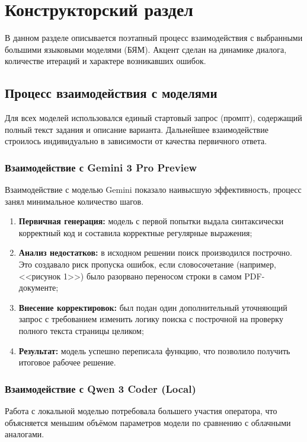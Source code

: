 \chapter{Конструкторский раздел}

В данном разделе описывается поэтапный процесс взаимодействия с выбранными большими языковыми моделями (БЯМ). Акцент сделан на динамике диалога, количестве итераций и характере возникавших ошибок.

\section{Процесс взаимодействия с моделями}

Для всех моделей использовался единый стартовый запрос (промпт), содержащий полный текст задания и описание варианта. Дальнейшее взаимодействие строилось индивидуально в зависимости от качества первичного ответа.

\subsection{Взаимодействие с Gemini 3 Pro Preview}
Взаимодействие с моделью Gemini показало наивысшую эффективность, процесс занял минимальное количество шагов.

\begin{enumerate}
    \item \textbf{Первичная генерация:} модель с первой попытки выдала синтаксически корректный код и составила корректные регулярные выражения;
    \item \textbf{Анализ недостатков:} в исходном решении поиск производился построчно. Это создавало риск пропуска ошибок, если словосочетание (например, <<рисунок 1>>) было разорвано переносом строки в самом PDF-документе;
    \item \textbf{Внесение корректировок:} был подан один дополнительный уточняющий запрос с требованием изменить логику поиска с построчной на проверку полного текста страницы целиком;
    \item \textbf{Результат:} модель успешно переписала функцию, что позволило получить итоговое рабочее решение.
\end{enumerate}

\subsection{Взаимодействие с Qwen 3 Coder (Local)}
Работа с локальной моделью потребовала большего участия оператора, что объясняется меньшим объёмом параметров модели по сравнению с облачными аналогами.

